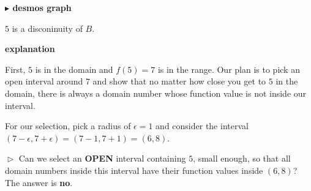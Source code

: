 \documentclass{ximera}
\begin{document}
\begin{example}
\begin{onlineOnly}
\textbf{\textcolor{blue!55!black}{$\blacktriangleright$ desmos graph}} 
\begin{center}
\end{center}
\end{onlineOnly}



$5$ is a disconinuity of $B$. 



\textbf{\textcolor{red!75!green}{explanation}} 


First, $5$ is in the domain and $f(5)=7$ is in the range.  Our plan is to pick an open interval around $7$ and show that no matter how close you get to $5$ in the domain, there is always a domain number whose function value is not inside our interval.


For our selection, pick a radius of $\epsilon = 1$ and consider the interval $(7-\epsilon , 7+\epsilon) = (7-1 , 7+1) = (6,8)$. 


\begin{image}
\end{image}



$\vartriangleright$ Can we select an \textbf{\textcolor{red!70!black}{OPEN}} interval containing $5$, small enough, so that all domain numbers inside this interval have their function values inside $(6,8)$?  The answer is \textbf{no}.





\end{example}
\end{document}
